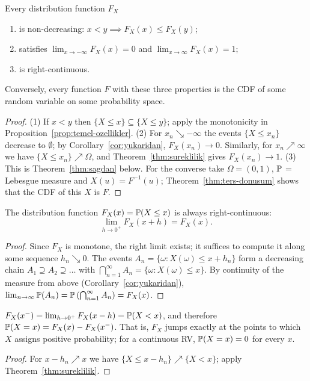 \documentclass[main.tex]{subfiles}
\begin{document}
\begin{theorem}\label{thm:cdf-ozellik}
Every distribution function $F_X$
\begin{enumerate}
  \item is non-decreasing: $x<y\implies F_X(x)\le F_X(y)$;
  \item satisfies $\lim_{x\to-\infty}F_X(x)=0$ and $\lim_{x\to\infty}F_X(x)=1$;
  \item is right-continuous.
\end{enumerate}
Conversely, every function $F$ with these three properties is the CDF of some random variable on some probability space.
\end{theorem}
\begin{proof}
(1) If $x<y$ then $\{X\le x\}\subseteq\{X\le y\}$; apply the monotonicity in Proposition~\ref{prop:temel-ozellikler}.
(2) For $x_n\searrow-\infty$ the events $\{X\le x_n\}$ decrease to $\emptyset$; by Corollary~\ref{cor:yukaridan}, $F_X(x_n)\to0$. Similarly, for $x_n\nearrow\infty$ we have $\{X\le x_n\}\nearrow\Omega$, and Theorem~\ref{thm:sureklilik} gives $F_X(x_n)\to1$.
(3) This is Theorem~\ref{thm:sagdan} below.
For the converse take $\Omega=(0,1)$, $\P$ = Lebesgue measure and $X(u)=F^{-1}(u)$; Theorem~\ref{thm:ters-donusum} shows that the CDF of this $X$ is $F$.
\end{proof}

\begin{theorem}\label{thm:sagdan}
The distribution function $F_X(x) = \P(X \le x)$ is always right-continuous:
\[
\lim_{h \to 0^+} F_X(x + h) = F_X(x).
\]
\end{theorem}
\begin{proof}
Since $F_X$ is monotone, the right limit exists; it suffices to compute it along some sequence $h_n\searrow0$. The events $A_n = \{\omega : X(\omega) \le x + h_n\}$ form a decreasing chain $A_1 \supseteq A_2 \supseteq \dots$ with $\bigcap_{n=1}^\infty A_n = \{\omega : X(\omega) \le x\}$. By continuity of the measure from above (Corollary~\ref{cor:yukaridan}), $\lim_{n \to \infty} \P(A_n) = \P\left(\bigcap_{n=1}^\infty A_n\right) = F_X(x)$.
\end{proof}

\begin{corollary}
$F_X(x^-)=\lim_{h\to0^+}F_X(x-h)=\P(X<x)$, and therefore $\P(X=x)=F_X(x)-F_X(x^-)$. That is, $F_X$ jumps exactly at the points to which $X$ assigns positive probability; for a continuous RV, $\P(X=x)=0$ for every $x$.
\end{corollary}
\begin{proof}
For $x-h_n\nearrow x$ we have $\{X\le x-h_n\}\nearrow\{X<x\}$; apply Theorem~\ref{thm:sureklilik}.
\end{proof}
\end{document}
